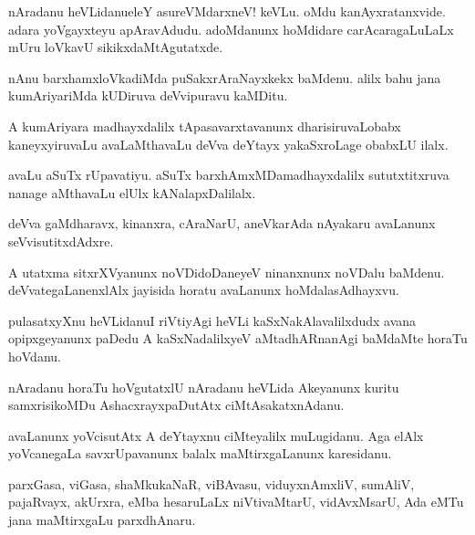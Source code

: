 \begin{mng}
nAradanu heVLidanu\mdash eleY asureVMdarxneV! keVLu. oMdu kanAyxratanxvide. adara yoVgayxteyu apAravAdudu. adoMdanunx hoMdidare carAcaragaLuLaLx mUru loVkavU sikikxdaMtAgutatxde.
\end{mng}

\begin{mng}
nAnu barxhamxloVkadiMda puSakxrAraNayxkekx baMdenu. alilx bahu jana kumAriyariMda kUDiruva deVvipuravu kaMDitu.
\end{mng}

\begin{mng}
A kumAriyara madhayxdalilx tApasavarxtavanunx dharisiruvaLobabx kaneyxyiruvaLu avaLaMthavaLu deVva deYtayx yakaSxroLage obabxLU ilalx.
\end{mng}

\begin{mng}
avaLu aSuTx rUpavatiyu. aSuTx barxhAmxMDamadhayxdalilx sututxtitxruva nanage aMthavaLu elUlx kANalapxDalilalx.
\end{mng}

\begin{mng}
deVva gaMdharavx, kinanxra, cAraNarU, aneVkarAda nAyakaru avaLanunx seVvisutitxdAdxre.
\end{mng}

\begin{mng}
A utatxma sitxrXVyanunx noVDidoDaneyeV ninanxnunx noVDalu baMdenu. deVvategaLanenxlAlx jayisida horatu avaLanunx hoMdalasAdhayxvu.
\end{mng}

\begin{mng}
pulasatxyXnu heVLidanu\mdash I riVtiyAgi heVLi kaSxNakAlavalilxdudx avana opipxgeyanunx paDedu A kaSxNadalilxyeV aMtadhARnanAgi baMdaMte horaTu hoVdanu.
\end{mng}

\begin{mng}
nAradanu horaTu hoVgutatxlU nAradanu heVLida Akeyanunx kuritu samxrisikoMDu AshacxrayxpaDutAtx ciMtAsakatxnAdanu.
\end{mng}

\begin{mng}
avaLanunx yoVcisutAtx A deYtayxnu ciMteyalilx muLugidanu. Aga elAlx yoVcanegaLa savxrUpavanunx balalx maMtirxgaLanunx karesidanu.
\end{mng}

\begin{mng}
parxGasa, viGasa, shaMkukaNaR, viBAvasu, viduyxnAmxliV, sumAliV, pajaRvayx, akUrxra, eMba hesaruLaLx niVtivaMtarU, vidAvxMsarU, Ada eMTu jana maMtirxgaLu parxdhAnaru.
\end{mng}

